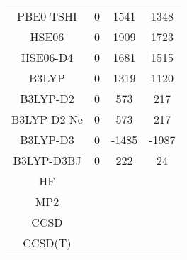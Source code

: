 \begin{table}[ht]
\begin{tabular}{cccc}
PBE0-TSHI & 0 & 1541 & 1348 \\ 
HSE06 & 0 & 1909 & 1723 \\ 
HSE06-D4 & 0 & 1681 & 1515 \\ 
B3LYP & 0 & 1319 & 1120 \\ 
B3LYP-D2 & 0 & 573 & 217 \\ 
B3LYP-D2-Ne & 0 & 573 & 217 \\ 
B3LYP-D3 & 0 & -1485 & -1987 \\ 
B3LYP-D3BJ & 0 & 222 & 24 \\ 
HF &  \\ 
MP2 &  \\ 
CCSD &  \\ 
CCSD(T) &  \\ 
\hline\hline
\end{tabular}
\end{table}